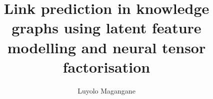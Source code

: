 \graphicspath{{Figs/}} %
\title{Link prediction in knowledge graphs using latent feature modelling and neural tensor factorisation}


\author{Luyolo Magangane}







     
